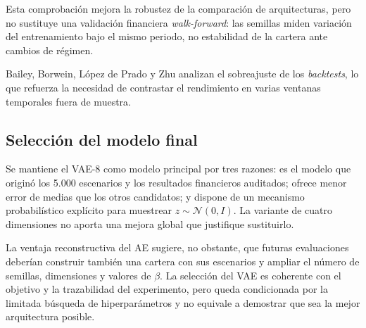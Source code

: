 Esta comprobación mejora la robustez de la comparación de arquitecturas, pero no sustituye una validación financiera \textit{walk-forward}: las semillas miden variación del entrenamiento bajo el mismo periodo, no estabilidad de la cartera ante cambios de régimen.

Bailey, Borwein, López de Prado y Zhu \citeyear{bailey2017probability} analizan el sobreajuste de los \textit{backtests}, lo que refuerza la necesidad de contrastar el rendimiento en varias ventanas temporales fuera de muestra.

\subsection{Selección del modelo final}
Se mantiene el VAE-8 como modelo principal por tres razones: es el modelo que originó los 5.000 escenarios y los resultados financieros auditados; ofrece menor error de medias que los otros candidatos; y dispone de un mecanismo probabilístico explícito para muestrear $z\sim\mathcal{N}(0,I)$. La variante de cuatro dimensiones no aporta una mejora global que justifique sustituirlo.

La ventaja reconstructiva del AE sugiere, no obstante, que futuras evaluaciones deberían construir también una cartera con sus escenarios y ampliar el número de semillas, dimensiones y valores de $\beta$. La selección del VAE es coherente con el objetivo y la trazabilidad del experimento, pero queda condicionada por la limitada búsqueda de hiperparámetros y no equivale a demostrar que sea la mejor arquitectura posible.


